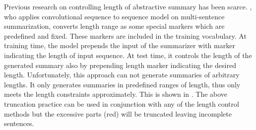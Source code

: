 Previous research on controlling length of abstractive summary
has been scarce.
\citet{abs-1711-05217}, who applies convolutional sequence to sequence model on multi-sentence summarization,
converts length range as some special markers which are predefined and fixed.
These markers are included in the training vocabulary.
At training time, the model prepends the input of the summarizer with marker indicating 
the length of input sequence.
At test time, it controls the length of the generated summary also by
prepending length marker indicating the desired length.
Unfortunately, this approach can not generate summaries of
arbitrary lengths. It only generates summaries in predefined
ranges of length, thus only meets the length constraints approximately.
This is shown in .
The above truncation practice can be used in conjunction with
any of the length control methods but the excessive parts (red) will be
truncated leaving incomplete sentences.

